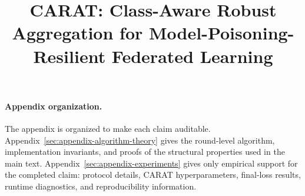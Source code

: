 \documentclass{article}
\title{CARAT: Class-Aware Robust Aggregation for Model-Poisoning-Resilient Federated Learning}
\begin{document}
\maketitle

















\newpage
\appendix

\paragraph{Appendix organization.}
The appendix is organized to make each claim auditable. Appendix~\ref{sec:appendix-algorithm-theory} gives the round-level algorithm, implementation invariants, and proofs of the structural properties used in the main text. Appendix~\ref{sec:appendix-experiments} gives only empirical support for the completed claim: protocol details, CARAT hyperparameters, final-loss results, runtime diagnostics, and reproducibility information.



\end{document}
